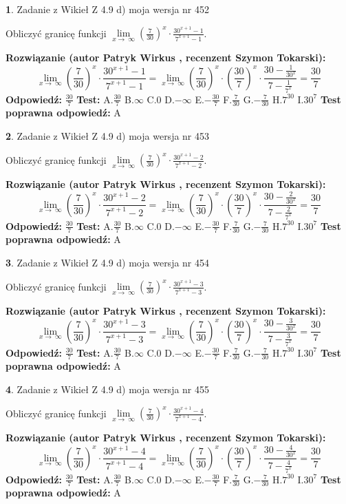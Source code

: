 \documentclass[12pt, a4paper]{article}
\theoremstyle{definition} %
\newtheorem{zad}{}
\newcommand{\zadStart}[1]{\begin{zad}#1\newline}
\newcommand{\zadStop}{\end{zad}}
\newcommand{\rozwStart}[2]{\noindent \textbf{Rozwiązanie (autor #1 , recenzent #2): }\newline}
\newcommand{\rozwStop}{\newline}
\newcommand{\odpStart}{\noindent \textbf{Odpowiedź:}\newline}
\newcommand{\odpStop}{\newline}
\newcommand{\testStart}{\noindent \textbf{Test:}\newline}
\newcommand{\testStop}{\newline}
\newcommand{\kluczStart}{\noindent \textbf{Test poprawna odpowiedź:}\newline}
\newcommand{\kluczStop}{\newline}
\begin{document}
\zadStart{Zadanie z Wikieł Z 4.9 d) moja wersja nr 452}


Obliczyć granicę funkcji  $\lim\limits_{x\to\ \infty}(\frac{7}{30})^{x}\cdot\frac{30^{x+1}-1}{7^{x+1}-1}$.
\zadStop
\rozwStart{Patryk Wirkus}{Szymon Tokarski}
$$\lim\limits_{x\to\ \infty}(\frac{7}{30})^{x}\cdot\frac{30^{x+1}-1}{7^{x+1}-1}=\lim\limits_{x\to\ \infty}(\frac{7}{30})^{x}\cdot(\frac{30}{7})^{x} \cdot \frac{30-\frac{1}{30^{x}}}{7-\frac{1}{7^{x}}} = \frac{30}{7}$$
\rozwStop
\odpStart
$\frac{30}{7}$
\odpStop
\testStart
A.$\frac{30}{7}$ B.$\infty$ C.$0$ D.$-\infty$ E.$-\frac{30}{7}$
F.$\frac{7}{30}$ G.$-\frac{7}{30}$
H.$7^{30}$
I.$30^{7}$
\testStop
\kluczStart
A
\kluczStop



\zadStart{Zadanie z Wikieł Z 4.9 d) moja wersja nr 453}


Obliczyć granicę funkcji  $\lim\limits_{x\to\ \infty}(\frac{7}{30})^{x}\cdot\frac{30^{x+1}-2}{7^{x+1}-2}$.
\zadStop
\rozwStart{Patryk Wirkus}{Szymon Tokarski}
$$\lim\limits_{x\to\ \infty}(\frac{7}{30})^{x}\cdot\frac{30^{x+1}-2}{7^{x+1}-2}=\lim\limits_{x\to\ \infty}(\frac{7}{30})^{x}\cdot(\frac{30}{7})^{x} \cdot \frac{30-\frac{2}{30^{x}}}{7-\frac{2}{7^{x}}} = \frac{30}{7}$$
\rozwStop
\odpStart
$\frac{30}{7}$
\odpStop
\testStart
A.$\frac{30}{7}$ B.$\infty$ C.$0$ D.$-\infty$ E.$-\frac{30}{7}$
F.$\frac{7}{30}$ G.$-\frac{7}{30}$
H.$7^{30}$
I.$30^{7}$
\testStop
\kluczStart
A
\kluczStop



\zadStart{Zadanie z Wikieł Z 4.9 d) moja wersja nr 454}


Obliczyć granicę funkcji  $\lim\limits_{x\to\ \infty}(\frac{7}{30})^{x}\cdot\frac{30^{x+1}-3}{7^{x+1}-3}$.
\zadStop
\rozwStart{Patryk Wirkus}{Szymon Tokarski}
$$\lim\limits_{x\to\ \infty}(\frac{7}{30})^{x}\cdot\frac{30^{x+1}-3}{7^{x+1}-3}=\lim\limits_{x\to\ \infty}(\frac{7}{30})^{x}\cdot(\frac{30}{7})^{x} \cdot \frac{30-\frac{3}{30^{x}}}{7-\frac{3}{7^{x}}} = \frac{30}{7}$$
\rozwStop
\odpStart
$\frac{30}{7}$
\odpStop
\testStart
A.$\frac{30}{7}$ B.$\infty$ C.$0$ D.$-\infty$ E.$-\frac{30}{7}$
F.$\frac{7}{30}$ G.$-\frac{7}{30}$
H.$7^{30}$
I.$30^{7}$
\testStop
\kluczStart
A
\kluczStop



\zadStart{Zadanie z Wikieł Z 4.9 d) moja wersja nr 455}


Obliczyć granicę funkcji  $\lim\limits_{x\to\ \infty}(\frac{7}{30})^{x}\cdot\frac{30^{x+1}-4}{7^{x+1}-4}$.
\zadStop
\rozwStart{Patryk Wirkus}{Szymon Tokarski}
$$\lim\limits_{x\to\ \infty}(\frac{7}{30})^{x}\cdot\frac{30^{x+1}-4}{7^{x+1}-4}=\lim\limits_{x\to\ \infty}(\frac{7}{30})^{x}\cdot(\frac{30}{7})^{x} \cdot \frac{30-\frac{4}{30^{x}}}{7-\frac{4}{7^{x}}} = \frac{30}{7}$$
\rozwStop
\odpStart
$\frac{30}{7}$
\odpStop
\testStart
A.$\frac{30}{7}$ B.$\infty$ C.$0$ D.$-\infty$ E.$-\frac{30}{7}$
F.$\frac{7}{30}$ G.$-\frac{7}{30}$
H.$7^{30}$
I.$30^{7}$
\testStop
\kluczStart
A
\kluczStop
\end{document}

